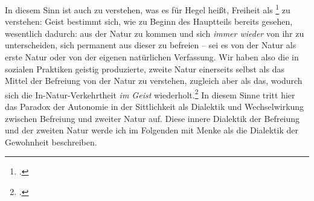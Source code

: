 \documentclass[12pt, a4paper, openany]{report}
\begin{document}
In diesem Sinn ist auch zu verstehen, was es für Hegel heißt, Freiheit als \footcite[][§ 194 A, S. 197.]{hegel_grundlinien_2017} zu verstehen: 
Geist bestimmt sich, wie zu Beginn des Hauptteils bereits gesehen, wesentlich dadurch: 
aus der Natur zu kommen und sich \emph{immer wieder} von ihr zu unterscheiden, sich permanent aus dieser zu befreien -- sei es von der Natur als erste Natur oder von der eigenen natürlichen Verfassung.
Wir haben also die in sozialen Praktiken geistig produzierte, zweite Natur einerseits selbst als das Mittel der Befreiung von der Natur zu verstehen, zugleich aber als das, wodurch sich die In-Natur-Verkehrtheit \emph{im Geist} wiederholt.\footcite[Vgl.][41]{menke_autonomie_2018}
In diesem Sinne tritt hier das Paradox der Autonomie in der Sittlichkeit als Dialektik und Wechselwirkung zwischen Befreiung und zweiter Natur auf.
Diese innere Dialektik der Befreiung und der zweiten Natur werde ich im Folgenden mit Menke als die Dialektik der Gewohnheit beschreiben.
\end{document}
